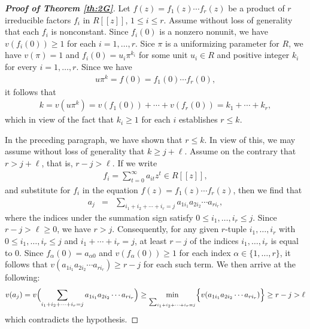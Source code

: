 \documentclass[10pt,a4paper]{amsart}
\begin{document}
\begin{proof}[\bf Proof of Theorem \ref{th:2G}]
Let $f(z)=f_1(z)\cdots f_r(z)$ be a product of $r$ irreducible factors $f_i$ in $R[[z]]$, $1\leq i\leq r$.  Assume without loss of generality that each $f_i$ is nonconstant. Since $f_i(0)$ is a nonzero nonunit, we have  $v(f_i(0))\geq 1$ for each $i=1,\ldots,r$. Sice $\pi$ is a uniformizing parameter for $R$, we have $v(\pi)=1$ and $f_i(0)=u_i\pi^{k_i}$ for some unit $u_i\in R$ and positive integer $k_i$ for every $i=1,\ldots,r$. Since we have
\begin{eqnarray*}
u\pi^k=f(0)=f_1(0)\cdots f_r(0),
\end{eqnarray*}
it follows that
\begin{eqnarray*}
k=v(u\pi^k)=v(f_1(0))+\cdots +v(f_r(0))=k_1+\cdots+k_r,
\end{eqnarray*}
which in view of the fact that $k_i\geq 1$ for each $i$ establishes $r\leq k$.

In the preceding paragraph, we have shown that $r\leq k$. In view of this, we may assume without loss of generality that $k\geq j+\ell$. Assume on the contrary that $r>j+\ell$, that is, $r-j> \ell$. If we write
\begin{eqnarray*}
f_i=\sum_{t=0}^{\infty}a_{it}z^t\in R[[z]],
\end{eqnarray*}
and substitute for $f_i$ in the equation $f(z)=f_1(z)\cdots f_r(z)$, then we find that
\begin{eqnarray*}
a_j &=& \sum_{i_1+i_2+\cdots+i_r=j}a_{1i_1}a_{2i_2}\cdots a_{ri_r},
\end{eqnarray*}
where the indices under the summation sign satisfy $0\leq i_1,\ldots,i_r\leq j$. Since $r-j>\ell\geq 0$, we have $r>j$. Consequently, for any given $r$-tuple $i_1,\ldots,i_r$ with $0\leq i_1,\ldots,i_r\leq j$ and $i_1+\cdots+i_r=j$, at least $r-j$ of the indices $i_1,\ldots,i_r$ is equal to 0. Since  $f_\alpha(0)=a_{\alpha0}$ and $v(f_\alpha(0))\geq 1$ for each index $\alpha\in \{1,\ldots,r\}$, it follows that  $v(a_{1i_1}a_{2i_2}\cdots a_{ri_r})\geq r-j$ for each such term. We then arrive at the following:
\begin{eqnarray*}
v(a_j)=v\Bigl(\sum_{i_1+i_2+\cdots+i_r=j}a_{1i_1}a_{2i_2}\cdots a_{ri_r}\Bigr)\geq \min_{\sum_{i_1+i_2+\cdots+i_r=j}} \Bigl\{v(a_{1i_1}a_{2i_2}\cdots a_{ri_r})\Bigr\}\geq r-j>\ell
\end{eqnarray*}
which contradicts the hypothesis.
\end{proof}
\end{document}
